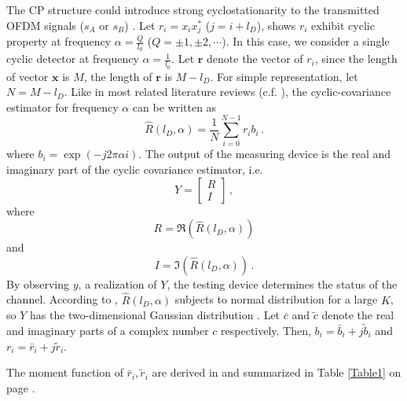 The CP structure could introduce strong cyclostationarity to the transmitted OFDM signals ($s_A$ or $s_B$) \cite{lunden2010robust}. 
Let $r_i=x_ix_j^\ast$ ($j=i+l_D$), \cite{lunden2007spectrum} shows $r_i$ exhibit cyclic property at frequency $\alpha = \frac{Q}{l_0}$ ($Q = \pm1, \pm2, \cdots$). In this case, we consider a single cyclic detector at frequency $\alpha = \frac{1}{l_0}$. 
Let $\mathbf{r}$ denote the vector of $r_i$, since the length of vector $\mathbf{x}$ is $M$, the length of $\mathbf{r}$ is $M - l_D$. For simple representation, let $N = M - l_D$.
Like in most related literature reviews (c.f. \cite{lunden2010robust} \cite{dandawate1994statistical}), the cyclic-covariance estimator for frequency $\alpha$ can be written as
\begin{equation}
  \hat{R}(l_D, \alpha) = \frac{1}{N}\sum_{i=0}^{N-1} r_ib_i\,.
  \label{cyclicR}
\end{equation}
where $b_i = \exp(-j2\pi\alpha i)$. 
The output of the measuring device is the real and imaginary part of the cyclic covariance estimator, i.e. 
\begin{equation}
  Y = \begin{bmatrix}
	R \\
	I
  \end{bmatrix}\,,
  \label{cyclic_cov}
\end{equation}
where 
\[
  R = \Re(\hat{R}(l_D, \alpha))
\]
and 
\[
  I = \Im(\hat{R}(l_D, \alpha))\,.
\]
By observing $y$, a realization  of $Y$, the testing device determines the status of the channel.
According to \cite{lunden2010robust}, $\hat{R}(l_D, \alpha)$ subjects to normal distribution for a large $K$, so $Y$ has the two-dimensional Gaussian distribution \cite{goodman1963statistical}.
Let $\bar{c}$ and $\tilde{c}$ denote the real and imaginary parts of a complex number $c$ respectively. Then, $b_i = \bar{b}_i + j\tilde{b}_i$  and $r_i = \bar{r}_i + j\tilde{r}_i$. 

The moment function of $\bar{r}_i, \tilde{r}_i$ are derived in \cite{axell2011optimal} and summarized in Table \ref{Table1} on page \pageref{Table1}.

